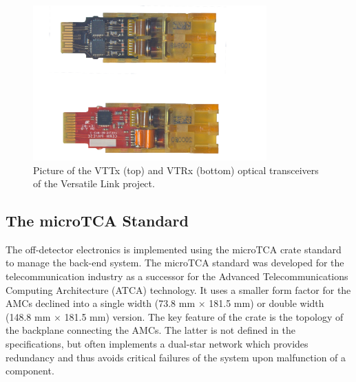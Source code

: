       \begin{figure}[b!]
        \centering
        \includegraphics[width=0.8\textwidth]{img/II-2-daq/versatile.jpg}
        \caption{Picture of the VTTx (top) and VTRx (bottom) optical transceivers of the Versatile Link project.}
        \label{fig:II-2-versatile}
      \end{figure}

    \subsection{The microTCA Standard}

      The off-detector electronics is implemented using the microTCA crate standard to manage the back-end system. The microTCA standard was developed for the telecommunication industry as a successor for the Advanced Telecommunications Computing Architecture (ATCA) technology. It uses a smaller form factor for the AMCs declined into a single width (73.8 mm $ \times $ 181.5 mm) or double width (148.8 mm $ \times $ 181.5 mm) version. The key feature of the crate is the topology of the backplane connecting the AMCs. The latter is not defined in the specifications, but often implements a dual-star network which provides redundancy and thus avoids critical failures of the system upon malfunction of a component. \\

